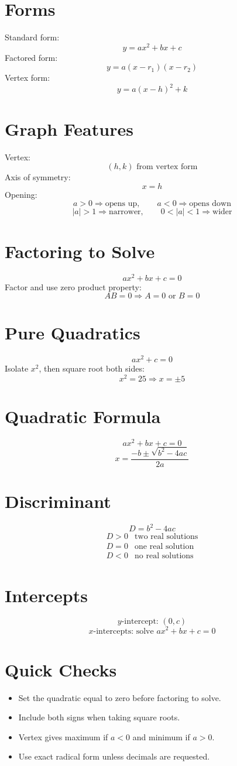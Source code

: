 \documentclass[11pt]{article}
\begin{document}

\section*{Forms}
Standard form:
\[
y=ax^2+bx+c
\]
Factored form:
\[
y=a(x-r_1)(x-r_2)
\]
Vertex form:
\[
y=a(x-h)^2+k
\]

\section*{Graph Features}
Vertex:
\[
(h,k)\text{ from vertex form}
\]
Axis of symmetry:
\[
x=h
\]
Opening:
\[
a>0\Rightarrow \text{opens up},\qquad a<0\Rightarrow \text{opens down}
\]
\[
|a|>1\Rightarrow \text{narrower},\qquad 0<|a|<1\Rightarrow \text{wider}
\]

\section*{Factoring to Solve}
\[
ax^2+bx+c=0
\]
Factor and use zero product property:
\[
AB=0\Rightarrow A=0\text{ or }B=0
\]

\section*{Pure Quadratics}
\[
ax^2+c=0
\]
Isolate $x^2$, then square root both sides:
\[
x^2=25\Rightarrow x=\pm5
\]

\section*{Quadratic Formula}
\[
ax^2+bx+c=0
\]
\[
x=\frac{-b\pm\sqrt{b^2-4ac}}{2a}
\]

\section*{Discriminant}
\[
D=b^2-4ac
\]
\[
\begin{array}{ll}
D>0 & \text{two real solutions}\\
D=0 & \text{one real solution}\\
D<0 & \text{no real solutions}
\end{array}
\]

\section*{Intercepts}
\[
y\text{-intercept: }(0,c)
\]
\[
x\text{-intercepts: solve }ax^2+bx+c=0
\]

\section*{Quick Checks}
\begin{itemize}
  \item Set the quadratic equal to zero before factoring to solve.
  \item Include both signs when taking square roots.
  \item Vertex gives maximum if $a<0$ and minimum if $a>0$.
  \item Use exact radical form unless decimals are requested.
\end{itemize}
\end{document}

